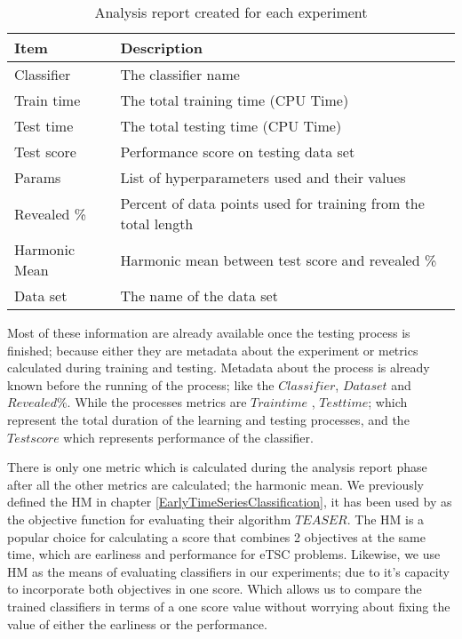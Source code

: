 \begin{table}[hbt!]
  \setlength\extrarowheight{2pt} %
  \begin{tabularx}{\textwidth}{|X|X|}
  \hline
  \textbf{Item} & \textbf{Description} \\ \hline
    Classifier                 & The classifier name                                             \\ \hline
    Train time                 & The total training time (CPU Time)                              \\ \hline
    Test time                  & The total testing time (CPU Time)                               \\ \hline
    Test score                 & Performance score on testing data set                           \\ \hline
    Params                     & List of hyperparameters used and their values                   \\ \hline
    Revealed \%                & Percent of data points used for training from the total length  \\ \hline
    Harmonic Mean              & Harmonic mean between test score and revealed \%                \\ \hline
    Data set                   & The name of the data set                                        \\ \hline
  \end{tabularx}
  \caption{Analysis report created for each experiment}
  \label{TableAnalysisReport}
\end{table}

Most of these information are already available once the testing process is finished; because either they are metadata about the experiment or metrics calculated during training and testing.
Metadata about the process is already known before the running of the process; like the $Classifier$, $Data set$ and $Revealed \%$.
While the processes metrics are $Train time$ , $Test time$; which represent the total duration of the learning and testing processes, and the $Test score$ which represents performance of the classifier.


There is only one metric which is calculated during the analysis report phase after all the other metrics are calculated; the harmonic mean.
We previously defined the HM in chapter \ref{EarlyTimeSeriesClassification}, it has been used by \cite{schafer2020teaser} as the objective function for evaluating their algorithm $TEASER$.
The HM is a popular choice for calculating a score that combines 2 objectives at the same time, which are earliness and performance for eTSC problems.
Likewise, we use HM as the means of evaluating classifiers in our experiments; due to it's capacity to incorporate both objectives in one score.
Which allows us to compare the trained classifiers in terms of a one score value without worrying about fixing the value of either the earliness or the performance.

